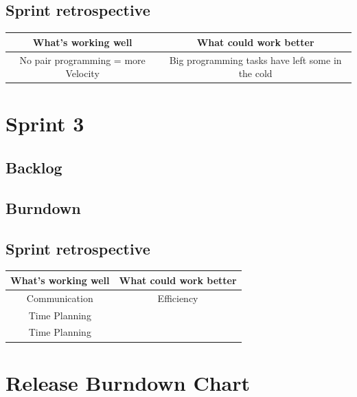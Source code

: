 \subsection{Sprint retrospective}

\begin{center}
\begin{tabular}{|c|c|}
\hline \textbf{What's working well} & \textbf{What could work better} \\ 
\hline No pair programming = more Velocity & Big programming tasks have left some in the cold \\ 
\hline 
\end{tabular} 
\end{center}




\newpage
\section{Sprint 3}
\label{chap:Spring 3}

\subsection{Backlog}


\subsection{Burndown}


\subsection{Sprint retrospective}

\begin{center}
\begin{tabular}{|c|c|}
\hline \textbf{What's working well} & \textbf{What could work better} \\ 
\hline Communication & Efficiency \\ 
 Time Planning &  \\ 
 Time Planning &  \\ 
\hline 
\end{tabular} 
\end{center}



\newpage
\section{Release Burndown Chart}
\label{chap:Release Burndown Chart}
\begin{center}
\end{center}




